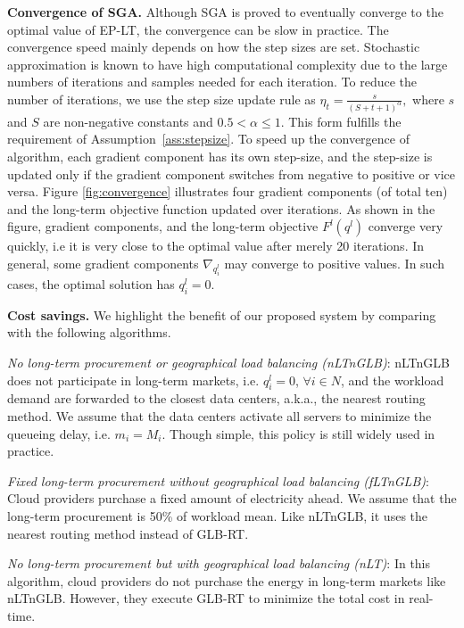\textbf{Convergence of SGA.} Although SGA is proved to eventually
converge to the optimal value of EP-LT, the convergence can be slow in
practice. The convergence speed mainly depends on how the step sizes
are set. Stochastic approximation is known to have high computational
complexity due to the large numbers of iterations and samples needed
for each iteration. To reduce the number of iterations, we use the
step size update rule as $\eta_t=\frac{s}{(S+t+1)^\alpha},$ where
$s$ and $S$ are non-negative constants and $ 0.5 < \alpha \leq
1$. This form fulfills the requirement of
Assumption~\ref{ass:stepsize}.
To speed up the convergence of algorithm, each gradient component has
its own step-size, and the step-size is updated only if the gradient
component switches from negative to positive or vice versa. Figure
\ref{fig:convergence} illustrates four gradient components (of total
ten) and the long-term objective function updated over iterations. As
shown in the figure, gradient components, and the long-term objective
$F^l(q^l)$ converge very quickly, i.e it is very close to the optimal
value after merely 20 iterations. In general, some gradient components
$\nabla_{q^l_i}$ may converge to positive values. In such cases, the
optimal solution has $q^l_i=0$.

\textbf{Cost savings.} We highlight the benefit of our proposed system
by comparing with the following algorithms.

\textit{No long-term procurement or geographical load balancing (nLTnGLB)}: nLTnGLB does not participate in long-term markets, i.e. $q^l_i = 0$, $\forall i \in N$, and the workload demand are forwarded to the closest data centers, a.k.a., the nearest routing method. We assume that the data centers activate all servers to minimize the queueing delay, i.e. $m_i=M_i$. Though simple, this policy is still widely used in practice.

\textit{Fixed long-term procurement without geographical load balancing (fLTnGLB)}: Cloud providers purchase a fixed amount of electricity ahead. We assume that the long-term procurement is 50\% of workload mean. Like nLTnGLB, it uses the nearest routing method instead of GLB-RT.

\textit{No long-term procurement but with geographical load balancing (nLT)}: In this algorithm, cloud providers do not purchase the energy in long-term markets like nLTnGLB. However, they execute GLB-RT to minimize the total cost in real-time.

